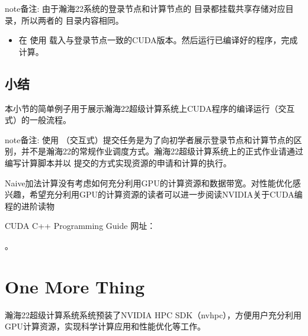 \documentclass[a4paper,12pt,english]{sphinxmanual}
\begin{document}
\noindent{}

\begin{sphinxadmonition}{note}{备注:}
\sphinxAtStartPar
由于瀚海22系统的登录节点和计算节点的  目录都挂载共享存储对应目录，所以两者的  目录内容相同。
\end{sphinxadmonition}
\begin{itemize}
\item {} 
\sphinxAtStartPar
在  使用  载入与登录节点一致的CUDA版本。然后运行已编译好的程序，完成计算。

\end{itemize}

\noindent{}


\subsection{小结}
\label{\detokenize{gpu-computing/gpu-computing:id13}}
\sphinxAtStartPar
本小节的简单例子用于展示瀚海22超级计算系统上CUDA程序的编译运行（交互式）的一般流程。

\begin{sphinxadmonition}{note}{备注:}
\sphinxAtStartPar
使用  （交互式）提交任务是为了向初学者展示登录节点和计算节点的区别，并不是瀚海22的常规作业调度方式。瀚海22超级计算系统上的正式作业请通过编写计算脚本并以  提交的方式实现资源的申请和计算的执行。
\end{sphinxadmonition}

\sphinxAtStartPar
Naive加法计算没有考虑如何充分利用GPU的计算资源和数据带宽。对性能优化感兴趣，希望充分利用GPU的计算资源的读者可以进一步阅读NVIDIA关于CUDA编程的进阶读物 %
\begin{footnote}[5]\sphinxAtStartFootnote
CUDA C++ Programming Guide
网址：
%
\end{footnote}。


\section{One More Thing}
\label{\detokenize{gpu-computing/gpu-computing:one-more-thing}}
\sphinxAtStartPar
瀚海22超级计算系统系统预装了NVIDIA HPC SDK（nvhpc），方便用户充分利用GPU计算资源，实现科学计算应用和性能优化等工作。
\end{document}

